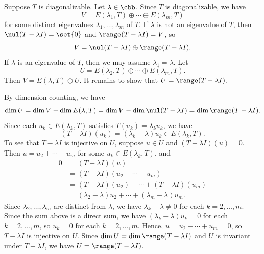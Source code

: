\begin{sol}
    Suppose $T$ is diagonalizable.
    Let $\lambda \in \cbb$.
    Since $T$ is diagonalizable, we have
    \[
        V = E(\lambda_1, T) \oplus \cdots \oplus E(\lambda_m, T)
    \]
    for some distinct eigenvalues $\lambda_1, \ldots, \lambda_m$ of $T$.
    If $\lambda$ is not an eigenvalue of $T$, then $\nul(T - \lambda I) = \set{0}$ and $\range(T - \lambda I) = V$, so
    \[
        V = \nul(T - \lambda I) \oplus \range(T - \lambda I).
    \]
    If $\lambda$ is an eigenvalue of $T$, then we may assume $\lambda_1 = \lambda$.
    Let
    \[
        U = E(\lambda_2, T) \oplus \cdots \oplus E(\lambda_m, T).
    \]
    Then $V = E(\lambda, T) \oplus U$.
    It remains to show that $U = \range(T - \lambda I)$.

    By dimension counting, we have
    \[
        \dim U = \dim V - \dim E(\lambda, T) = \dim V - \dim \nul(T - \lambda I) = \dim \range(T - \lambda I).
    \]
    Since each $u_k \in E(\lambda_k, T)$ satisfies $T(u_k) = \lambda_k u_k$, we have
    \[
        (T - \lambda I)(u_k) = (\lambda_k - \lambda) u_k \in E(\lambda_k, T).
    \]
    To see that $T - \lambda I$ is injective on $U$, suppose $u \in U$ and $(T - \lambda I)(u) = 0$.
    Then $u = u_2 + \cdots + u_m$ for some $u_k \in E(\lambda_k, T)$, and
    \begin{align*}
        0 &= (T - \lambda I)(u) \\
          &= (T - \lambda I)(u_2 + \cdots + u_m) \\
          &= (T - \lambda I)(u_2) + \cdots + (T - \lambda I)(u_m) \\
          &= (\lambda_2 - \lambda) u_2 + \cdots + (\lambda_m - \lambda) u_m.
    \end{align*}
    Since $\lambda_2, \ldots, \lambda_m$ are distinct from $\lambda$, we have $\lambda_k - \lambda \neq 0$ for each $k = 2, \ldots, m$.
    Since the sum above is a direct sum, we have $(\lambda_k - \lambda) u_k = 0$ for each $k = 2, \ldots, m$, so $u_k = 0$ for each $k = 2, \ldots, m$.
    Hence, $u = u_2 + \cdots + u_m = 0$, so $T - \lambda I$ is injective on $U$.
    Since $\dim U = \dim \range(T - \lambda I)$ and $U$ is invariant under $T - \lambda I$, we have $U = \range(T - \lambda I)$.


\end{sol}
